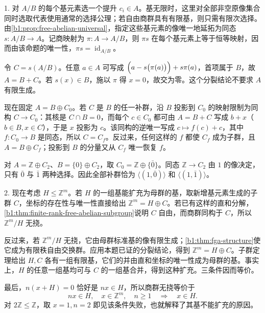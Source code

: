 \begin{solution}
	1. 对 \(A/B\) 的每个基元素选一个提升 \(c_i\in A\)。基无限时，这里对全部非空原像集合同时选取代表使用通常的选择公理；若自由商群具有有限基，则只需有限次选择。由\cref{b1:prop:free-abelian-universal}，指定这些基元素的像唯一地延拓为同态 \(s:A/B\to A\)。记商映射为 \(\pi:A\to A/B\)，则 \(\pi s\) 在每个基元素上等于恒等映射，因而由该命题的唯一性，\(\pi s=\operatorname{id}_{A/B}\)。

	令 \(C=s(A/B)\)。任意 \(a\in A\) 可写成 \(\Bigl(a-s\bigl(\pi(a)\bigr)\Bigr)+s\pi(a)\)，首项属于 \(B\)，故 \(A=B+C\)。若 \(s(x)\in B\)，施以 \(\pi\) 得 \(x=0\)，故交为零。这个分裂结论不要求 \(A\) 有限生成。

	现在固定 \(A=B\oplus C_0\)。若 \(C\) 是 \(B\) 的任一补群，沿 \(B\) 投影到 \(C_0\) 的映射限制为同构 \(C\to C_0\)：其核是 \(C\cap B=0\)，而每个 \(c\in C_0\) 都可由 \(A=B+C\) 写成 \(b+x\)（\(b\in B,x\in C\)），于是 \(x\) 投影为 \(c\)。该同构的逆唯一写成 \(c\mapsto f(c)+c\)，其中 \(f:C_0\to B\) 是同态，所以 \(C=C_f\)。反过来，任何这样的 \(f\) 都使 \(C_f\) 成为子群，且 \(A=B\oplus C_f\)；投影到 \(B\) 的分量又从 \(C_f\) 唯一恢复 \(f\)。

	对 \(A=\mathbb Z\oplus C_2\)、\(B=\{0\}\oplus C_2\)，取 \(C_0=\mathbb Z\oplus\{\bar0\}\)。同态 \(\mathbb Z\to C_2\) 由 \(1\) 的像决定，只有 \(\bar0\) 与 \(\bar1\) 两种选择。因此全部补群恰为 \(\bigl\langle(1,\bar0)\bigr\rangle\) 和 \(\bigl\langle(1,\bar1)\bigr\rangle\)。

	2. 现在考虑 \(H\le\mathbb Z^m\)。若 \(H\) 的一组基能扩充为母群的基，取新增基元素生成的子群 \(C\)，坐标的存在性与唯一性直接给出 \(\mathbb Z^m=H\oplus C\)。若已有这样的直和分解，\cref{b1:thm:finite-rank-free-abelian-subgroup}说明 \(C\) 自由，而商群同构于 \(C\)，所以 \(\mathbb Z^m/H\) 无挠。

	反过来，若 \(\mathbb Z^m/H\) 无挠，它由母群标准基的像有限生成；\cref{b1:thm:fga-structure}使它成为有限秩自由交换群。应用本题已证的分裂结论，得到 \(\mathbb Z^m=H\oplus C\)。子群定理给出 \(H,C\) 各有一组有限基，它们的并由直和坐标的唯一性成为母群的基。事实上，\(H\) 的任意一组基均可与 \(C\) 的一组基合并，得到这种扩充。三条件因而等价。

	最后，\(n(x+H)=0\) 恰好是 \(nx\in H\)，所以商群无挠等价于
	\[
		nx\in H,\quad x\in\mathbb Z^m,\quad n\ge1 \quad\Longrightarrow\quad x\in H.
	\]
	对 \(2\mathbb Z\le\mathbb Z\)，取 \(x=1,n=2\) 即见该条件失败，也就解释了其基不能扩充的原因。
\end{solution}

